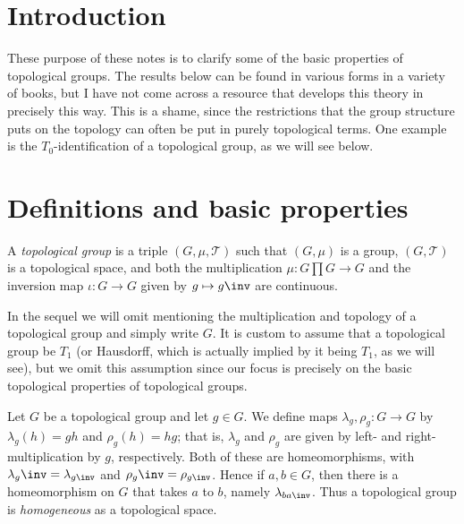 \documentclass[article, a4paper, 11pt, oneside]{memoir}
\title{\doctitle}
\author{\docauthor}
\numberwithin{equation}{chapter}
\newcommand{\calT}{\mathcal{T}}
\begin{document}
\maketitle

\chapter{Introduction}

These purpose of these notes is to clarify some of the basic properties of topological groups. The results below can be found in various forms in a variety of books, but I have not come across a resource that develops this theory in precisely this way. This is a shame, since the restrictions that the group structure puts on the topology can often be put in purely topological terms. One example is the $T_0$-identification of a topological group, as we will see below.


\chapter{Definitions and basic properties}

\begin{definition}
    \label{def:topological_group}
    A \emph{topological group} is a triple $(G, \mu, \calT)$ such that $(G, \mu)$ is a group, $(G, \calT)$ is a topological space, and both the multiplication $\mu \colon G \prod G \to G$ and the inversion map $\iota \colon G \to G$ given by $g \mapsto g\inv$ are continuous.
\end{definition}
%
In the sequel we will omit mentioning the multiplication and topology of a topological group and simply write $G$. It is custom to assume that a topological group be $T_1$ (or Hausdorff, which is actually implied by it being $T_1$, as we will see), but we omit this assumption since our focus is precisely on the basic topological properties of topological groups.

\newcommand{\leftmult}{\lambda}
\newcommand{\rightmult}{\rho}

Let $G$ be a topological group and let $g \in G$. We define maps $\leftmult_g, \rightmult_g \colon G \to G$ by $\leftmult_g(h) = gh$ and $\rightmult_g(h) = hg$; that is, $\leftmult_g$ and $\rightmult_g$ are given by left- and right-multiplication by $g$, respectively. Both of these are homeomorphisms, with $\leftmult_g\inv = \leftmult_{g\inv}$ and $\rightmult_g\inv = \rightmult_{g\inv}$. Hence if $a, b \in G$, then there is a homeomorphism on $G$ that takes $a$ to $b$, namely $\leftmult_{ba\inv}$. Thus a topological group is \emph{homogeneous} as a topological space.
\end{document}
